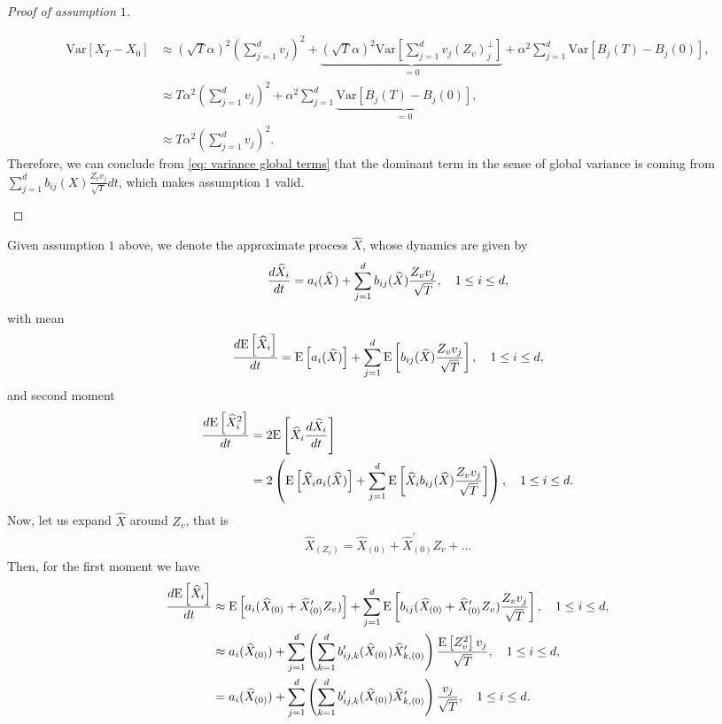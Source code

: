 \begin{proof}[Proof of assumption $1$]
\begin{itemize}
\begin{align}\label{eq: variance global terms}
\text{Var}[X_T-X_0] &\approx \left( \sqrt{T}\alpha \right)^2 \left( \sum_{j=1}^d v_j \right)^2  + \underset{=0}{\underbrace{\left( \sqrt{T} \alpha \right)^2  \text{Var}\left[ \sum_{j=1}^d v_j  (Z_v)^\perp_j \right]}}+ \alpha^2 \sum_{j=1}^d \text{Var} \left[B_j(T)-B_j(0)\right],\nonumber\\
& \approx  T \alpha^2 \left( \sum_{j=1}^d v_j \right)^2  + \alpha^2 \sum_{j=1}^d \underset{=0}{\underbrace{\text{Var} \left[B_j(T)-B_j(0)\right]}},\nonumber\\
& \approx  T \alpha^2 \left( \sum_{j=1}^d v_j \right)^2.
\end{align}
Therefore, we can conclude from \eqref{eq: variance global terms} that the dominant term in the sense of global variance is coming from $\sum_{j=1}^d b_{ij}(X)  \frac{Z_v v_j}{\sqrt{T}} dt$, which makes assumption $1$  valid.
\end{itemize}
\end{proof}

Given assumption $1$ above, we denote the approximate process $\hat{X}$, whose dynamics are given by
\begin{align}\label{eq:approximate_dynamics}
\frac{d\widehat{X}_i}{dt}=a_i(\widehat{X})+\sum_{j=1}^d b_{ij}(\widehat{X})  \frac{Z_v v_j}{\sqrt{T}}, \quad 1 \le i \le d ,
\end{align}
with mean 
\begin{equation*}
\frac{d\mathrm{E}\left[\widehat{X}_i\right]}{dt}=\mathrm{E}\left[a_i(\widehat{X})\right]+\sum_{j=1}^d \mathrm{E}\left[b_{ij}(\widehat{X})  \frac{Z_v v_j}{\sqrt{T}}\right], \quad 1 \le i \le d ,
\end{equation*}
and second moment
\begin{align*}
\frac{d\mathrm{E}\left[\widehat{X}^2_i\right]}{dt}&=2 \mathrm{E}\left[\widehat{X}_i \frac{d\widehat{X}_i}{dt}\right]\nonumber\\
&=2 \left(\mathrm{E}\left[\widehat{X}_i a_i(\widehat{X})\right]+\sum_{j=1}^d \mathrm{E}\left[ \widehat{X}_i b_{ij}(\widehat{X})  \frac{Z_v v_j}{\sqrt{T}}\right]\right), \quad 1 \le i \le d .
\end{align*}
Now, let us expand $\hat{X}$ around $Z_v$, that is
\begin{align}
\hat{X}_{(Z_v)}=\hat{X}_{(0)}+\hat{X}^\prime_{(0)} Z_v+\dots
\end{align}
Then, for the first moment we have
\begin{align}\label{eq:first_moment_approximation}
\frac{d\mathrm{E}\left[\widehat{X}_i\right]}{dt}&\approx \mathrm{E}\left[a_i(\widehat{X}_{(0)}+\widehat{X}^\prime_{(0)} Z_v)\right]+\sum_{j=1}^d \mathrm{E}\left[b_{ij}(\widehat{X}_{(0)}+\widehat{X}^\prime_{(0)} Z_v)  \frac{Z_v v_j}{\sqrt{T}}\right], \quad 1 \le i \le d, \nonumber\\ 
&\approx a_i(\widehat{X}_{(0)})+\sum_{j=1}^d \left(\sum_{k=1}^d  b_{ij,k}^\prime(\widehat{X}_{(0)}) \widehat{X}_{k,(0)}^\prime\right) \frac{\mathrm{E}\left[Z_v^2\right] v_j}{\sqrt{T}}, \quad 1 \le i \le d,\nonumber\\ 
&= a_i(\widehat{X}_{(0)})+\sum_{j=1}^d \left(\sum_{k=1}^d  b_{ij,k}^\prime(\widehat{X}_{(0)}) \widehat{X}_{k,(0)}^\prime \right) \frac{v_j}{\sqrt{T}}, \quad 1 \le i \le d.
\end{align} 

